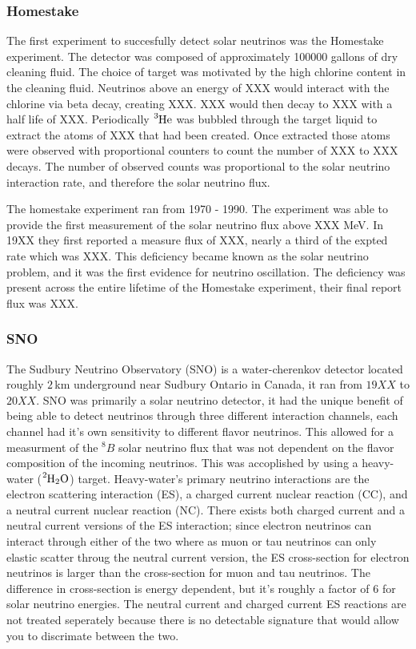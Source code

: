 \subsubsection{Homestake}
The first experiment to succesfully detect solar neutrinos was the Homestake
experiment.
The detector was composed of approximately 100000 gallons of dry cleaning fluid.
The choice of target was motivated by the high chlorine content in the cleaning
fluid. Neutrinos above an energy of XXX would interact with the chlorine via
beta decay, creating XXX. XXX would then decay to XXX with a half life of XXX.
Periodically $\ce{^{3}He}$ was bubbled through the
target liquid to extract the atoms of XXX that had been created. Once
extracted those atoms were observed with proportional counters to count the
number of XXX to XXX decays. The number of observed counts was proportional
to the solar neutrino interaction rate, and therefore the solar neutrino flux.

The homestake experiment ran from 1970 - 1990. %
The experiment was able to provide the first measurement of the solar neutrino
flux above XXX MeV. In 19XX they first reported a measure flux of
XXX, nearly a third of the expted rate which was XXX.
This deficiency became known as the solar neutrino problem, and it
was the first evidence for neutrino oscillation.
The deficiency was present across the entire lifetime of the Homestake experiment,
their final report flux was XXX.

\subsubsection{SNO}
The Sudbury Neutrino Observatory (SNO) is a water-cherenkov detector located
roughly $2$\,km underground near Sudbury Ontario in Canada, it ran from
$19XX$ to $20XX$.
SNO was primarily a solar neutrino detector, it had the unique benefit of
being able to detect neutrinos through three different interaction channels,
each channel had it's own sensitivity to different flavor neutrinos.
This allowed for a measurment of the $^8B$ solar neutrino flux that was not
dependent on the flavor composition of the incoming neutrinos.
This was accoplished by using a heavy-water ($\ce{^{2}H_{2}O}$) target.
Heavy-water's primary neutrino interactions are the
electron scattering interaction (ES), a charged current nuclear reaction (CC),
and a neutral current nuclear reaction (NC).
There exists both charged current and a neutral current versions of the
ES interaction; since electron neutrinos can interact through either
of the two where as muon or tau neutrinos can only elastic scatter throug the
neutral current version, the ES cross-section for electron neutrinos is larger
than the cross-section for muon and tau neutrinos.
The difference in cross-section is energy dependent, but it's roughly a factor
of 6 for solar neutrino energies. The neutral current and charged current ES reactions
are not treated seperately because there is no detectable signature that
would allow you to discrimate between the two.

